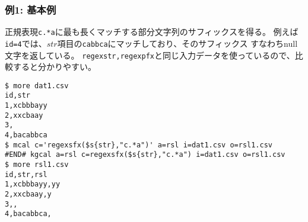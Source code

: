 \subsubsection*{例1: 基本例}

正規表現\verb|c.*a|に最も長くマッチする部分文字列のサフィックスを得る。
例えば\verb|id=4|では、$str$項目の\verb|cabbca|にマッチしており、そのサフィックス
すなわちnull文字を返している。
\verb|regexstr,regexpfx|と同じ入力データを使っているので、比較すると分かりやすい。


\begin{Verbatim}[baselinestretch=0.7,frame=single]
$ more dat1.csv
id,str
1,xcbbbayy
2,xxcbaay
3,
4,bacabbca
$ mcal c='regexsfx($s{str},"c.*a")' a=rsl i=dat1.csv o=rsl1.csv
#END# kgcal a=rsl c=regexsfx($s{str},"c.*a") i=dat1.csv o=rsl1.csv
$ more rsl1.csv
id,str,rsl
1,xcbbbayy,yy
2,xxcbaay,y
3,,
4,bacabbca,
\end{Verbatim}
